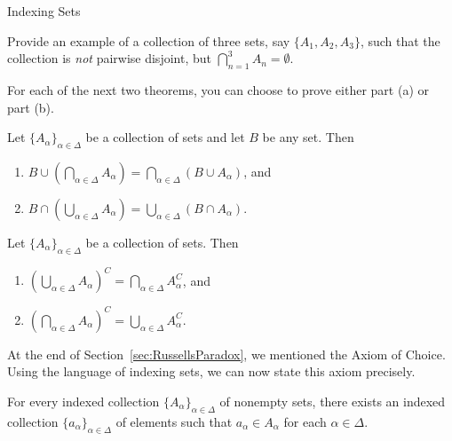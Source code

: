 \begin{section}{Indexing Sets}
\begin{problem}
Provide an example of a collection of three sets, say $\{A_1, A_2, A_3\}$, such that the collection is \emph{not} pairwise disjoint, but $\bigcap_{n=1}^3 A_n=\emptyset$.
\end{problem}

For each of the next two theorems, you can choose to prove either part (a) or part (b).

\begin{theorem}
Let $\{A_{\alpha}\}_{\alpha\in\Delta}$ be a collection of sets and let $B$ be any set.  Then
\begin{enumerate}[label=\textrm{(\alph*)}]
\item $\displaystyle B \cup \left(\bigcap_{\alpha\in\Delta}A_{\alpha}\right)=\bigcap_{\alpha\in\Delta}(B\cup A_{\alpha})$, and
\item $\displaystyle B \cap \left(\bigcup_{\alpha\in\Delta}A_{\alpha}\right)=\bigcup_{\alpha\in\Delta}(B\cap A_{\alpha})$.
\end{enumerate}
\end{theorem}

\begin{theorem}
Let $\{A_{\alpha}\}_{\alpha\in\Delta}$ be a collection of sets.  Then
\begin{enumerate}[label=\textrm{(\alph*)}]
\item $\displaystyle \left(\bigcup_{\alpha\in\Delta} A_{\alpha}\right)^C=\bigcap_{\alpha\in\Delta}A_{\alpha}^{C}$, and
\item $\displaystyle \left(\bigcap_{\alpha\in\Delta} A_{\alpha}\right)^C=\bigcup_{\alpha\in\Delta}A_{\alpha}^{C}$.
\end{enumerate}
\end{theorem}

At the end of Section~\ref{sec:RussellsParadox}, we mentioned the Axiom of Choice.  Using the language of indexing sets, we can now state this axiom precisely.

\begin{axiom}
For every indexed collection $\{A_{\alpha}\}_{\alpha\in\Delta}$ of nonempty sets, there exists an indexed collection $\{a_{\alpha}\}_{\alpha\in\Delta}$ of elements such that $a_{\alpha}\in A_{\alpha}$ for each $\alpha\in \Delta$.
\end{axiom}

\end{section}